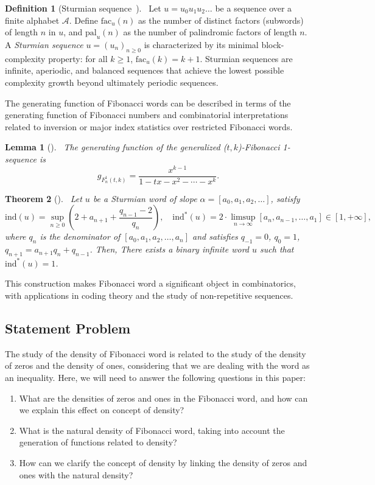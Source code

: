 \documentclass[11pt, a4paper]{article}
\newtheorem{theorem}{Theorem}[section]
\newtheorem{lemma}[theorem]{Lemma}
\theoremstyle{definition}
\newtheorem{definition}{Definition}[section]
\begin{document}
\begin{definition}[Sturmian sequence~\cite{Allouche2003Baake}]~\label{plann1}
Let $u = u_0 u_1 u_2 \ldots$ be a sequence over a finite alphabet $\mathcal{A}$. Define $\mathrm{fac}_u(n)$ as the number of distinct factors (subwords) of length $n$ in $u$, and $\mathrm{pal}_u(n)$ as the number of palindromic factors of length $n$. A \emph{Sturmian sequence} $u = (u_n)_{n \geq 0}$ is characterized by its minimal block-complexity property: for all $k \geq 1$, $\mathrm{fac}_u(k) = k + 1$. Sturmian sequences are infinite, aperiodic, and balanced sequences that achieve the lowest possible complexity growth beyond ultimately periodic sequences.
\end{definition}
The generating function of Fibonacci words can be described in terms of the generating function of Fibonacci numbers and combinatorial interpretations related to inversion or major index statistics over restricted Fibonacci words.
 \begin{lemma}[\cite{Mehraban2006Gulliver}]~\label{lemgenn1}
The generating function of the generalized ($t, k$)-Fibonacci 1-sequence is
\[
g_{F_{n}^{1}(t, k)}=\frac{x^{k-1}}{1-t x-x^{2}-\cdots-x^{k}}.
\]
 \end{lemma}

\begin{theorem}[\cite{Allouche2003Baake}]~\label{thmconsn1}
Let $u$ be a Sturmian word of slope $\alpha = [a_0, a_1, a_2, \ldots]$, satisfy
    \[
    \mathrm{ind}(u) = \sup_{n \geq 0} \left( 2 + a_{n+1} + \frac{q_{n-1} - 2}{q_n} \right), \quad \mathrm{ind}^*(u) = 2 \cdot \limsup_{n \to \infty} [a_n, a_{n-1}, \ldots, a_1] \in [1, +\infty],
    \]
    where $q_n$ is the denominator of $[a_0, a_1, a_2, \ldots, a_n]$ and satisfies $q_{-1} = 0$, $q_0 = 1$, $q_{n+1} = a_{n+1} q_n + q_{n-1}$. Then, There exists a binary infinite word $u$ such that $\mathrm{ind}^*(u) = 1$.
\end{theorem}
This construction makes Fibonacci word a significant object in combinatorics, with applications in coding theory and the study of non-repetitive sequences.
\subsection{Statement Problem}
The study of the density of Fibonacci word is related to the study of the density of zeros and the density of ones, considering that we are dealing with the word as an inequality. Here, we will need to answer the following questions in this paper:
\begin{enumerate}
    \item What are the densities of zeros and ones in the Fibonacci word, and how can we explain this effect on concept of density?
    \item What is the natural density of Fibonacci word, taking into account the generation of functions related to density?
    \item How can we clarify the concept of density by linking the density of zeros and ones with the natural density?
\end{enumerate}
\end{document}
